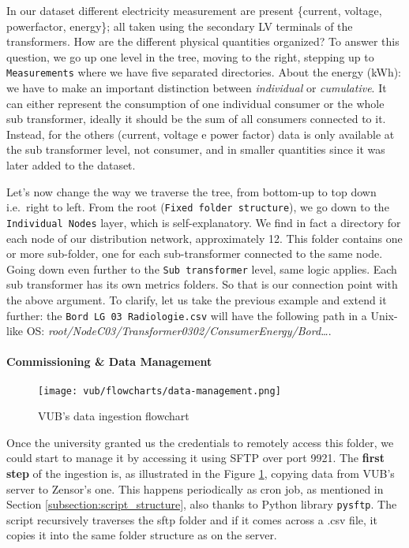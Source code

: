 In our dataset different electricity measurement are present \{current, voltage, power\-factor, energy\}; all taken using the secondary \ac{LV} terminals of the transformers.
How are the different physical quantities organized? 
To answer this question, we go up one level in the tree, moving to the right, stepping up to \texttt{Measurements} where we have five separated directories.
About the energy (kWh): we have to make an important distinction between \textit{individual} or \textit{cumulative}. It can either represent the consumption of one individual consumer or the whole sub transformer, 
ideally it should be the sum of all consumers connected to it.
Instead, for the others (current, voltage e power factor) data is only available at the sub transformer level, not consumer, and in smaller quantities since it was later added to the dataset.

Let's now change the way we traverse the tree, from bottom-up to top down i.e.\ right to left.
From the root (\texttt{Fixed folder structure}), we go down to the \texttt{Individual Nodes} layer, which is self-explanatory. We find in fact a directory for each node of our distribution network, approximately 12. 
This folder contains one or more sub-folder, one for each sub-transformer connected to the same node. Going down even further to the \texttt{Sub transformer} level, same logic applies. Each sub transformer has its own metrics folders.
So that is our connection point with the above argument.
To clarify, let us take the previous example and extend it further: the \texttt{Bord LG 03 Radiologie.csv} will have the following path in a Unix-like OS: \textit{root/NodeC03/Transformer0302/ConsumerEnergy/Bord\dots}.

\paragraph{Commissioning \& Data Management}
\begin{figure}[ht]
    \texttt{[image: vub/flowcharts/data-management.png]}
    \caption{\acs{VUB}'s data ingestion flowchart}
    \label{fig:vub_ingestion}
\end{figure}
Once the university granted us the credentials to remotely access this folder, we could start to manage it by accessing it using \ac{SFTP} over port 9921. %
The \textbf{first step} of the ingestion is, as illustrated in the Figure \ref{fig:vub_ingestion}, copying data from \ac{VUB}'s server to Zensor's one. 
This happens periodically as cron job, as mentioned in Section \ref{subsection:script_structure}, also thanks to Python library \texttt{pysftp}. %
The script recursively traverses the sftp folder and if it comes across a .csv file, it copies it into the same folder structure as on the server.

